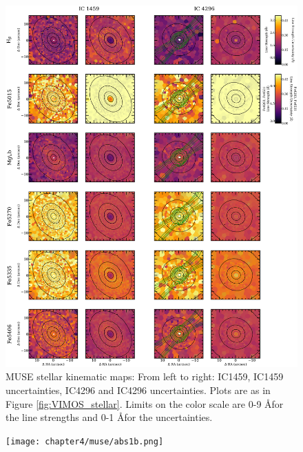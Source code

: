 		\begin{figure}
			\centering
			\includegraphics[height=0.94\textheight]{chapter4/muse/abs1.png}
			\caption[MUSE absorption line strength maps]{MUSE stellar kinematic maps: From left to right: IC1459, IC1459 uncertainties, IC4296 and IC4296 uncertainties. Plots are as in Figure \ref{fig:VIMOS_stellar}. Limits on the color scale are 0-9 \AA  for the line strengths and 0-1 \AA  for the uncertainties.}
			\label{fig:MUSE_absorption}
		\end{figure}
		\begin{figure}
			\centering
			\texttt{[image: chapter4/muse/abs1b.png]}
		\end{figure}
